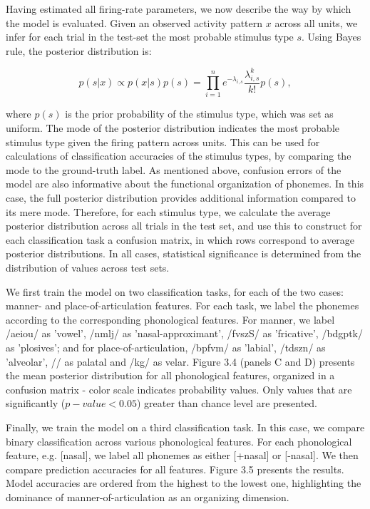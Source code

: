 Having estimated all firing-rate parameters, we now describe the way by which the model is evaluated. Given an observed activity pattern $x$ across all units, we infer for each trial in the test-set the most probable stimulus type $s$. Using Bayes rule, the posterior distribution is: 

\begin{equation}
    p(s|x) \propto p(x|s)p(s) = \prod_{i=1}^n{e^{-\lambda_{i,s}}\frac{\lambda_{i,s}^k}{k!}p(s)}, 
\end{equation}

where $p(s)$ is the prior probability of the stimulus type, which was set as uniform. The mode of the posterior distribution indicates the most probable stimulus type given the firing pattern across units. This can be used for calculations of classification accuracies of the stimulus types, by comparing the mode to the ground-truth label. As mentioned above, confusion errors of the model are also informative about the functional organization of phonemes. In this case, the full posterior distribution provides additional information compared to its mere mode. Therefore, for each stimulus type, we calculate the average posterior distribution across all trials in the test set, and use this to construct for each classification task a confusion matrix, in which rows correspond to average posterior distributions. In all cases, statistical significance is determined from the distribution of values across test sets.

We first train the model on two classification tasks, for each of the two cases: manner- and place-of-articulation features. For each task, we label the phonemes according to the corresponding phonological features. For manner, we label /aeiou/ as 'vowel', /nmlj/ as 'nasal-approximant', /fvszS/ as 'fricative', /bdgptk/ as 'plosives'; and for place-of-articulation, /bpfvm/ as 'labial', /tdszn/ as 'alveolar', // as palatal and /kg/ as velar. Figure 3.4 (panels C and D) presents the mean posterior distribution for all phonological features, organized in a confusion matrix - color scale indicates probability values. Only values that are significantly ($p-value<0.05$) greater than chance level are presented. 

Finally, we train the model on a third classification task. In this case, we compare binary classification across various phonological features. For each phonological feature, e.g. [nasal], we label all phonemes as either [+nasal] or [-nasal]. We then compare prediction accuracies for all features. Figure 3.5 presents the results. Model accuracies are ordered from the highest to the lowest one, highlighting the dominance of manner-of-articulation as an organizing dimension.

